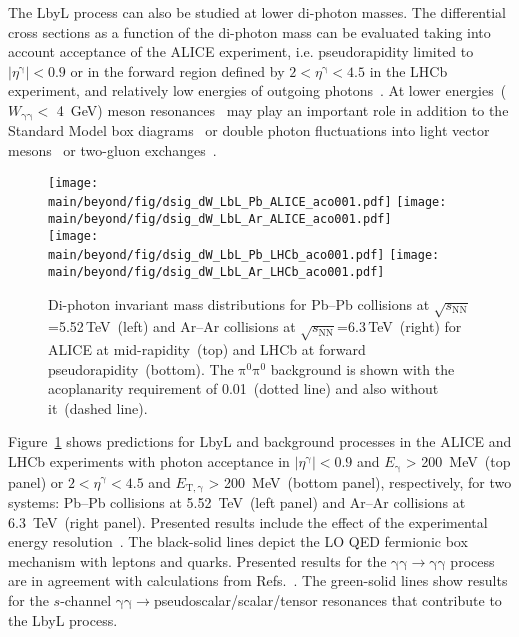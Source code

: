 The LbyL process can also be studied at lower di-photon masses. The differential cross sections as a function of the di-photon mass can be evaluated taking into account acceptance of the ALICE experiment, i.e. pseudorapidity limited to $|\eta^{\mathrm{\gamma}}|<0.9$ or in the forward region defined by $2<\eta^{\mathrm{\gamma}}<4.5$ in the LHCb experiment, and relatively low energies of outgoing photons~\cite{Abelev:2014ypa}. At lower energies~($W_{\mathrm{\gamma\gamma}} <$ 4~GeV) meson resonances~\cite{Klusek-Gawenda:2018ijg} may play an important role in addition to the Standard Model box diagrams~\cite{dEnterria:2013zqi,Klusek-Gawenda:2016euz} or double photon fluctuations into light vector mesons~\cite{Klusek-Gawenda:2016euz} or two-gluon exchanges~\cite{Klusek-Gawenda:2016nuo}.
\begin{figure}[!h]
        \texttt{[image: \\main/beyond/fig/dsig\_dW\_LbL\_Pb\_ALICE\_aco001.pdf]}%
        \texttt{[image: \\main/beyond/fig/dsig\_dW\_LbL\_Ar\_ALICE\_aco001.pdf]}\\
        \texttt{[image: \\main/beyond/fig/dsig\_dW\_LbL\_Pb\_LHCb\_aco001.pdf]}%
        \texttt{[image: \\main/beyond/fig/dsig\_dW\_LbL\_Ar\_LHCb\_aco001.pdf]}
        \caption{
                Di-photon invariant mass distributions for Pb--Pb collisions at $\sqrt{s_{\mathrm{NN}}}$=5.52\,TeV~(left) and Ar--Ar collisions at $\sqrt{s_{\mathrm{NN}}}$=6.3\,TeV~(right) for ALICE at mid-rapidity~(top) and LHCb at forward pseudorapidity~(bottom). The $\mathrm{\pi^0\pi^0}$ background is shown with the acoplanarity requirement of 0.01~(dotted line) and also without it~(dashed line).}
        \label{fig:lbyl_alice}
\end{figure}
Figure~\ref{fig:lbyl_alice} shows predictions for LbyL and background processes in the ALICE and LHCb experiments with photon acceptance in $|\eta^{\mathrm{\gamma}}|<0.9$ and $E_{\mathrm{\gamma}}$ > 200~MeV~(top panel) or $2<\eta^{\mathrm{\gamma}}<4.5$ and $E_{\mathrm{T,\gamma}}$ > 200~MeV~(bottom panel), respectively, for two systems: Pb--Pb collisions at 5.52~TeV~(left panel) and Ar--Ar collisions at 6.3~TeV~(right panel). Presented results include the effect of the experimental energy resolution~\cite{Acharya:2018yhg,Govorkova:2015vqa}. The black-solid lines depict the LO QED fermionic box mechanism with leptons and quarks. Presented results for the $\mathrm{\gamma\gamma\to\gamma\gamma}$ process are in agreement with calculations from Refs.~\cite{Jikia:1993tc,Bern:2001dg,Bardin:2009gq}. The green-solid lines show results for the $s$-channel $\mathrm{\gamma\gamma}\to$pseudoscalar/scalar/tensor resonances that contribute to the LbyL process.
